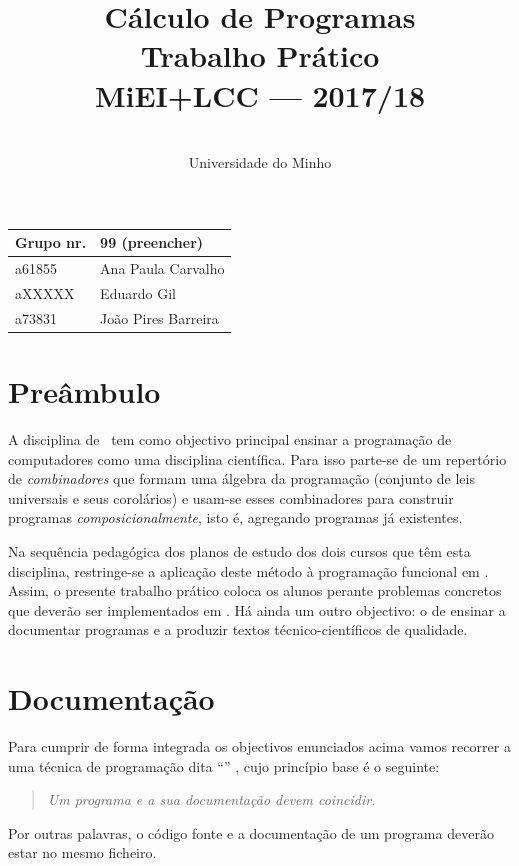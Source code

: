 \documentclass[a4paper]{article}
\title{
       	    Cálculo de Programas
\\
       	Trabalho Prático
\\
       	MiEI+LCC --- 2017/18
}
\author{
       	\dium
\\
       	Universidade do Minho
}
\date\mydate
\begin{document}
\maketitle

\begin{center}\large
\begin{tabular}{ll}
\textbf{Grupo} nr. & 99 (preencher)
\\\hline
a61855 & Ana Paula Carvalho
\\
aXXXXX & Eduardo Gil
\\
a73831 & João Pires Barreira		
\end{tabular}
\end{center}

\section{Preâmbulo}

A disciplina de \CP\ tem como objectivo principal ensinar
a progra\-mação de computadores como uma disciplina científica. Para isso
parte-se de um repertório de \emph{combinadores} que formam uma álgebra da
programação (conjunto de leis universais e seus corolários) e usam-se esses
combinadores para construir programas \emph{composicionalmente}, isto é,
agregando programas já existentes.
  
Na sequência pedagógica dos planos de estudo dos dois cursos que têm esta
disciplina, restringe-se a aplicação deste método à programação funcional
em \Haskell. Assim, 
o presente trabalho prático coloca os alunos perante problemas
concretos que deverão ser implementados em \Haskell.
Há ainda um outro objectivo: o de ensinar a documentar programas e
a produzir textos técnico-científicos de qualidade.

\section{Documentação}
Para cumprir de forma integrada os objectivos enunciados acima vamos recorrer
a uma técnica de programa\-ção dita ``'' \cite{Kn92}, cujo
princípio base é o seguinte:
\begin{quote}\em
Um programa e a sua documentação devem coincidir.
\end{quote}
Por outras palavras, o código fonte e a documentação de um programa deverão estar no
mesmo ficheiro.
\end{document}
